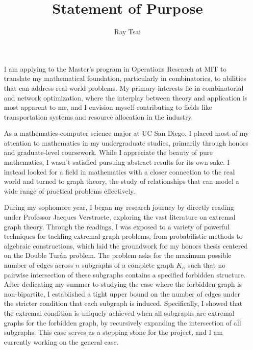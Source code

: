 \documentclass[12pt]{article}
\title{Statement of Purpose}
\author{Ray Tsai}
\date{}
\begin{document}
\maketitle

\vspace{-0.25in}

I am applying to the Master's program in Operations Research at MIT to translate my mathematical
foundation, particularly in combinatorics, to abilities that can address real-world problems. My
primary interests lie in combinatorial and network optimization, where the interplay between theory
and application is most apparent to me, and I envision myself contributing to fields like
transportation systems and resource allocation in the industry.

As a mathematics-computer science major at UC San Diego, I placed most of my attention to
mathematics in my undergraduate studies, primarily through honors and graduate-level coursework.
While I appreciate the beauty of pure mathematics, I wasn't satisfied pursuing abstract results for
its own sake. I instead looked for a field in mathematics with a closer connection to the real world
and turned to graph theory, the study of relationships that can model a wide range of practical
problems effectively.

During my sophomore year, I began my research journey by directly reading under Professor Jacques
Verstraete, exploring the vast literature on extremal graph theory. Through the readings, I was
exposed to a variety of powerful techniques for tackling extremal graph problems, from probabilistic
methods to algebraic constructions, which laid the groundwork for my honors thesis centered on the
Double Turán problem. The problem asks for the maximum possible number of edges across $n$ subgraphs
of a complete graph $K_n$ such that no pairwise intersection of these subgraphs contains a specified
forbidden structure. After dedicating my summer to studying the case where the forbidden graph is
non-bipartite, I established a tight upper bound on the number of edges under the stricter condition
that each subgraph is induced. Specifically, I showed that the extremal condition is uniquely
achieved when all subgraphs are extremal graphs for the forbidden graph, by recursively expanding
the intersection of all subgraphs. This case serves as a stepping stone for the project, and I am
currently working on the general case. 
\end{document}
